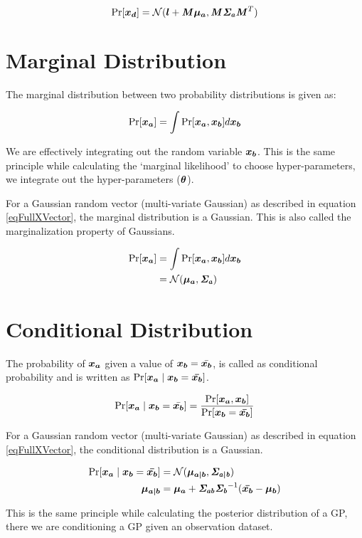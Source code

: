 \begin{equation}
    \Pr[\boldsymbol{x_d}] = \mathcal{N}(\boldsymbol{l} + \bm{\mathit{M}}\boldsymbol{\mu_a}, \bm{\mathit{M}}\bm{\mathit{\Sigma_a}}\bm{\mathit{M}}^T)
\end{equation}

\section{Marginal Distribution}
The marginal distribution between two probability distributions is given as:

\begin{equation}
   \Pr  [ \boldsymbol{x_a}  ] = \int \Pr  [ \boldsymbol{x_a}, \boldsymbol{x_b}  ] d\boldsymbol{x_b}  
\end{equation}

We are effectively integrating out the random variable $\boldsymbol{x_b}$. This is the same principle while calculating the `marginal likelihood' to choose hyper-parameters, we integrate out the hyper-parameters ($\boldsymbol{\theta}$). 

For a Gaussian random vector (multi-variate Gaussian) as described in equation \ref{eqFullXVector}, the marginal distribution is a Gaussian. This is also called the marginalization property of Gaussians. 

\begin{align}
   \Pr  [ \boldsymbol{x_a}  ] & = \int \Pr  [ \boldsymbol{x_a}, \boldsymbol{x_b}  ] d\boldsymbol{x_b} \\
                     & = \mathcal{N}(\boldsymbol{\mu_a}, \bm{\mathit{\Sigma_a}})
\end{align}

\section{Conditional Distribution}\label{secAppConditionalDistribution}
The probability of $\boldsymbol{x_a}$ given a value of $\boldsymbol{x_b} = \bar{\boldsymbol{x_b}}$, is called as conditional probability and is written as $\Pr[\boldsymbol{x_a} \mid \boldsymbol{x_b} = \boldsymbol{\bar{x_b}}]$. 

\begin{equation}
    \Pr[\boldsymbol{x_a} \mid \boldsymbol{x_b} = \bar{\boldsymbol{x_b}}] = \frac{\Pr[\boldsymbol{x_a}, \boldsymbol{x_b}]}{\Pr[\boldsymbol{x_b} = \boldsymbol{\bar{x_b}}]}
\end{equation}

For a Gaussian random vector (multi-variate Gaussian) as described in equation \ref{eqFullXVector}, the conditional distribution is a Gaussian. 

\begin{align}
    \Pr[\boldsymbol{x_a} \mid \boldsymbol{x_b} = \boldsymbol{\bar{x_b}}] & = \mathcal{N}(\boldsymbol{\mu_{a \mid b}}, \bm{\mathit{\Sigma_{a \mid b}}}) \\
    \boldsymbol{\mu_{a \mid b}} & = \boldsymbol{\mu_a} + \bm{\mathit{\Sigma_{ab}}}\bm{\mathit{\Sigma_b}}^{-1}(\boldsymbol{\bar{x_b}} - \boldsymbol{\mu_b})
\end{align}

This is the same principle while calculating the posterior distribution of a GP, there we are conditioning a GP given an observation dataset. 











